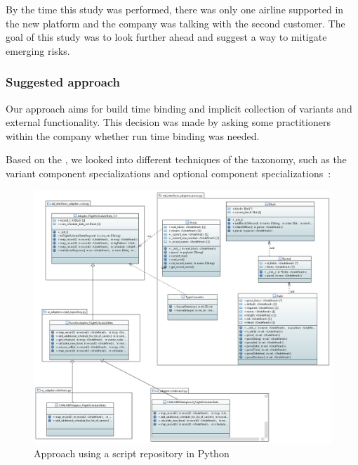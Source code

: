 By the time this study was performed, there was only one airline supported in the new platform and the company was talking with the second customer. The goal of this study was to look further ahead and suggest a way to mitigate emerging risks.  

\subsubsection{Suggested approach}
Our approach aims for build time binding and implicit collection of variants and external functionality. This decision was made by asking some practitioners within the company whether run time binding was needed. %

Based on the , we looked into different techniques of the taxonomy, such as the variant component specializations and optional component specializations~\cite{JillesVanGurp2001}: %

 \begin{figure}[!t]
 \centering
 \includegraphics[width=1.0 \textwidth]{figure/figure9.png}
 
 \caption{Approach using a script repository in Python}
 \label{fig:ourApproach}
 \end{figure}


